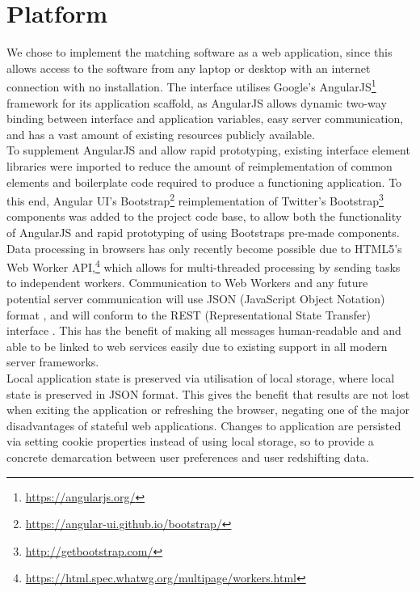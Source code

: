 \documentclass[iop]{emulateapj}
\begin{document}
\section{Platform}

We chose to implement the matching software as a web application, since this allows access to the software from any laptop or desktop with an internet connection with no installation. The interface utilises Google's AngularJS\footnote{\url{https://angularjs.org/}} framework for its application scaffold, as AngularJS allows dynamic two-way binding between interface and application variables, easy server communication, and has a vast amount of existing resources publicly available.\\

To supplement AngularJS and allow rapid prototyping, existing interface element libraries were imported to reduce the amount of reimplementation of common elements and boilerplate code required to produce a functioning application. To this end, Angular UI's Bootstrap\footnote{\url{https://angular-ui.github.io/bootstrap/}} reimplementation of Twitter's Bootstrap\footnote{\url{http://getbootstrap.com/}} components was added to the project code base, to allow both the functionality of AngularJS and rapid prototyping of using Bootstraps pre-made components.\\

Data processing in browsers has only recently become possible due to HTML5's Web Worker API,\footnote{\url{https://html.spec.whatwg.org/multipage/workers.html}} which allows for multi-threaded processing by sending tasks to independent workers. Communication to Web Workers and any future potential server communication will use JSON (JavaScript Object Notation) format \citep{bray2014javascript}, and will conform to the REST (Representational State Transfer) interface \citep{windley11rest}. This has the benefit of making all messages human-readable and and able to be linked to web services easily due to existing support in all modern server frameworks.\\


Local application state is preserved via utilisation of local storage, where local state is preserved in JSON format. This gives the benefit that results are not lost when exiting the application or refreshing the browser, negating one of the major disadvantages of stateful web applications. Changes to application are persisted via setting cookie properties instead of using local storage, so to provide a concrete demarcation between user preferences and user redshifting data.\\
\end{document}
